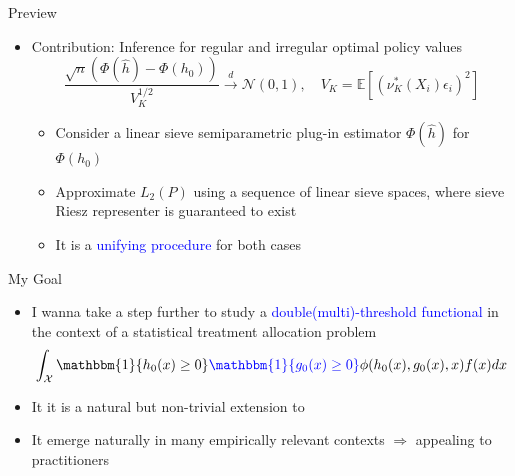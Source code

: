 \documentclass[aspectratio=169,xcolor=dvipsnames]{beamer}
\begin{document}
\begin{frame}{Preview}
    \begin{itemize}
        \item Contribution: Inference for regular and irregular optimal policy values
                \[
                \frac{\sqrt{n}(\Phi(\hat{h}) - \Phi(h_0))}{V_K^{1/2}} \xrightarrow[]{d}\mathcal{N}(0,1), \quad V_K = \mathbb{E}[(\nu_K^*(X_i)\epsilon_i)^2]
                \] 
                \begin{itemize}
                    \item[-] Consider a linear sieve semiparametric plug-in estimator  $\Phi(\hat{h})$ for $\Phi(h_0)$
                    \item[-] Approximate $L_2(P)$ using a sequence of linear sieve spaces, where sieve Riesz representer is guaranteed to exist
                    \item[-] It is a \textcolor{blue}{unifying procedure} for both cases
                \end{itemize}
    \end{itemize}
\end{frame}

\begin{frame}{My Goal}
    \begin{itemize}
         \item I wanna take a step further to study a \textcolor{blue}{double(multi)-threshold functional} in the context of a statistical treatment allocation problem
            \[
            \int_\mathcal{X}\mathbbm{1}\{h_0(x) \geq 0 \}\textcolor{blue}{\mathbbm{1}\{g_0(x) \geq 0 \}}\phi(h_0(x), g_0(x),x)f(x)dx
            \]
    
        \item It it is a natural but non-trivial extension to \citet*{chen2025inference}

        \bigskip
        \item It emerge naturally in many empirically relevant contexts $\Longrightarrow$ appealing to practitioners
    \end{itemize}
\end{frame}
\end{document}
